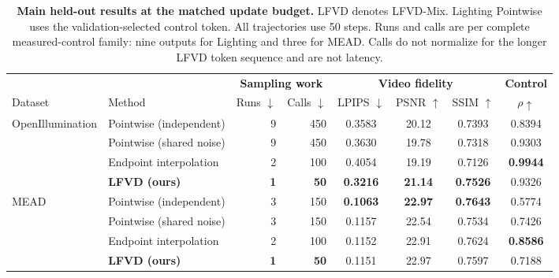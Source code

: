 \begin{table}[t]
\centering
\caption{\textbf{Main held-out results at the matched update budget.}
LFVD denotes LFVD-Mix. Lighting Pointwise uses the validation-selected
control token. All trajectories use 50 steps. Runs and calls are per complete
measured-control family: nine outputs for Lighting and three for MEAD. Calls
do not normalize for the longer LFVD token sequence and are not latency.}
\label{tab:main_results}
\small
\setlength{\tabcolsep}{4pt}
\renewcommand{\arraystretch}{1.10}
\begin{tabular*}{\textwidth}{@{\extracolsep{\fill}}llrrcccc@{}}
\toprule
&&\multicolumn{2}{c}{\textbf{Sampling work}}&\multicolumn{3}{c}{\textbf{Video fidelity}}&\textbf{Control}\\
\cmidrule(lr){3-4}\cmidrule(lr){5-7}\cmidrule(l){8-8}
Dataset & Method & Runs $\downarrow$ & Calls $\downarrow$ & LPIPS $\downarrow$ & PSNR $\uparrow$ & SSIM $\uparrow$ & $\rho\uparrow$\\
\midrule
OpenIllumination & Pointwise (independent) & 9 & 450 & 0.3583 & 20.12 & 0.7393 & 0.8394 \\
 & Pointwise (shared noise) & 9 & 450 & 0.3630 & 19.78 & 0.7318 & 0.9303 \\
 & Endpoint interpolation & 2 & 100 & 0.4054 & 19.19 & 0.7126 & \textbf{0.9944} \\
 & \textbf{LFVD (ours)} & \textbf{1} & \textbf{50} & \textbf{0.3216} & \textbf{21.14} & \textbf{0.7526} & 0.9326 \\
\midrule
MEAD & Pointwise (independent) & 3 & 150 & \textbf{0.1063} & \textbf{22.97} & \textbf{0.7643} & 0.5774 \\
 & Pointwise (shared noise) & 3 & 150 & 0.1157 & 22.54 & 0.7534 & 0.7426 \\
 & Endpoint interpolation & 2 & 100 & 0.1152 & 22.91 & 0.7624 & \textbf{0.8586} \\
 & \textbf{LFVD (ours)} & \textbf{1} & \textbf{50} & 0.1151 & 22.97 & 0.7597 & 0.7188 \\
\bottomrule
\end{tabular*}
\end{table}
